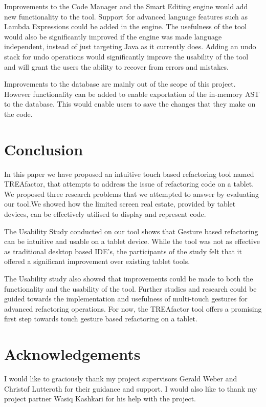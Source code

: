 \documentclass[10.5pt,twocolumn]{article}
\begin{document}
Improvements to the Code Manager and the Smart Editing engine would add new functionality to the tool. Support for advanced language features such as Lambda Expressions could be added in the engine. The usefulness of the tool would also be significantly improved if the engine was made language independent, instead of just targeting Java as it currently does. Adding an undo stack for undo operations would significantly improve the usability of the tool and will grant the users the ability to recover from errors and mistakes.

Improvements to the database are mainly out of the scope of this project. However functionality can be added to enable exportation of the in-memory AST to the database. This would enable users to save the changes that they make on the code.


\section{Conclusion}

In this paper we have proposed an intuitive touch based refactoring tool named TREAfactor, that attempts to address the issue of refactoring code on a tablet. We proposed three research problems that we attempted to answer by evaluating our tool.We showed how the limited screen real estate, provided by tablet devices, can be effectively utilised to display and represent code.

The Usability Study conducted on our tool shows that Gesture based refactoring can be intuitive and usable on a tablet device. While the tool was not as effective as traditional desktop based IDE's, the participants of the study felt that it offered a significant improvement over existing tablet tools.

The Usability study also showed that improvements could be made to both the functionality and the usability of the tool. Further studies and research could be guided towards the implementation and usefulness of multi-touch gestures for advanced refactoring operations. For now, the TREAfactor tool offers a promising first step towards touch gesture based refactoring on a tablet.

\section{Acknowledgements}
I would like to graciously thank my project supervisors Gerald Weber and Christof Lutteroth for their guidance and support. I would also like to thank my project partner Wasiq Kashkari for his help with the project.



\end{document}
